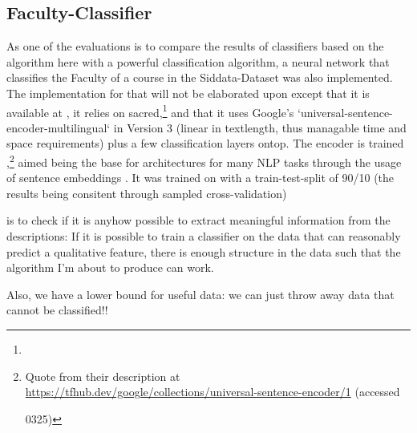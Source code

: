 \subsection*{Faculty-Classifier}
\label{sec:faculty_classifier}

As one of the evaluations is to compare the results of classifiers based on the algorithm here with a powerful classification algorithm, a neural network that classifies the Faculty of a course in the Siddata-Dataset was also implemented. The implementation for that will not be elaborated upon except that it is available at , it relies on sacred,\footnote{} and that it uses Google's `universal-sentence-encoder-multilingual` in Version 3 (linear in textlength, thus managable time and space requirements) plus a few classification layers ontop. The encoder is trained ,\footnote{Quote from their description at \url{https://tfhub.dev/google/collections/universal-sentence-encoder/1} (accessed \date{2022}{03}{25})} aimed being the base for architectures for many NLP tasks through the usage of sentence embeddings \cite{Guo}. It was trained on with a train-test-split of 90/10 (the results being consitent through sampled cross-validation)


 is to check if it is anyhow possible to extract meaningful information from the descriptions: If it is possible to train a classifier on the data that can reasonably predict a qualitative feature, there is enough structure in the data such that the algorithm I'm about to produce can work. 

Also, we have a lower bound for useful data: we can just throw away data that cannot be classified!!


